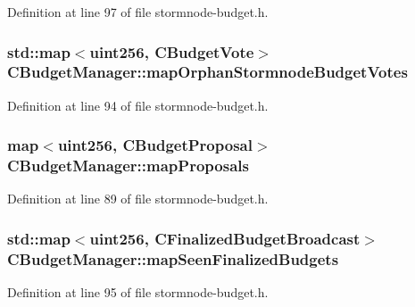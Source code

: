 Definition at line 97 of file stormnode-\/budget.\+h.

\hypertarget{class_c_budget_manager_a624092b33094fec6d113a94e79647c90}{}
\subsubsection[{map\+Orphan\+Stormnode\+Budget\+Votes}]{\setlength{\rightskip}{0pt plus 5cm}std\+::map$<${\bf uint256}, {\bf C\+Budget\+Vote}$>$ C\+Budget\+Manager\+::map\+Orphan\+Stormnode\+Budget\+Votes}\label{class_c_budget_manager_a624092b33094fec6d113a94e79647c90}


Definition at line 94 of file stormnode-\/budget.\+h.

\hypertarget{class_c_budget_manager_a25d2d0ede6489ea2069e1089dae39f49}{}
\subsubsection[{map\+Proposals}]{\setlength{\rightskip}{0pt plus 5cm}map$<${\bf uint256}, {\bf C\+Budget\+Proposal}$>$ C\+Budget\+Manager\+::map\+Proposals}\label{class_c_budget_manager_a25d2d0ede6489ea2069e1089dae39f49}


Definition at line 89 of file stormnode-\/budget.\+h.

\hypertarget{class_c_budget_manager_a289e14968fc776b8c0570b03ea8c8ecd}{}
\subsubsection[{map\+Seen\+Finalized\+Budgets}]{\setlength{\rightskip}{0pt plus 5cm}std\+::map$<${\bf uint256}, {\bf C\+Finalized\+Budget\+Broadcast}$>$ C\+Budget\+Manager\+::map\+Seen\+Finalized\+Budgets}\label{class_c_budget_manager_a289e14968fc776b8c0570b03ea8c8ecd}


Definition at line 95 of file stormnode-\/budget.\+h.

\hypertarget{class_c_budget_manager_aecbf6ad23e6f6044672d5619d3e7c40d}{}
